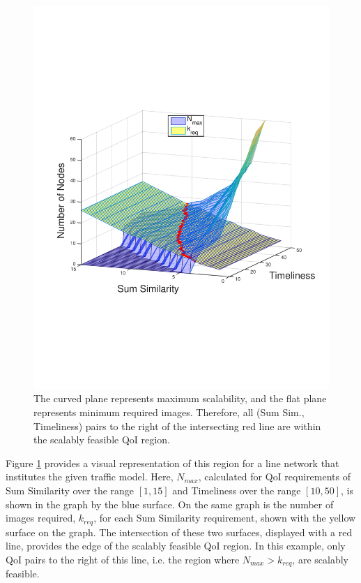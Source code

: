 \begin{figure}[ht]
\centering
\includegraphics[scale=0.31, clip=true, trim=10mm 65mm 10mm 77mm]{figures/scal_feas_qoi/scal_feas_qoi_corner_sink_6.pdf}
\caption{The curved plane represents maximum scalability, and the flat plane represents minimum required images.  Therefore, all (Sum Sim., Timeliness) pairs to the right of the intersecting red line are within the scalably feasible QoI region.}
 \label{fig:scal_feasible_region}
\end{figure}

Figure \ref{fig:scal_feasible_region} provides a visual representation of this region for a line network that institutes the given traffic model.
Here, $N_{max}$, calculated for QoI requirements of Sum Similarity over the range $[1, 15]$ and Timeliness over the range $[10, 50]$,
is shown in the graph by the blue surface.  On the same graph is the number of images required, $k_{req}$, for each Sum Similarity requirement, shown with the yellow surface on the graph.  The intersection of these two surfaces, displayed with a red line, provides the edge of the scalably feasible QoI region.  In this example, only QoI pairs to the right of this line, i.e. the region where $N_{max} > k_{req}$, are scalably feasible.  

